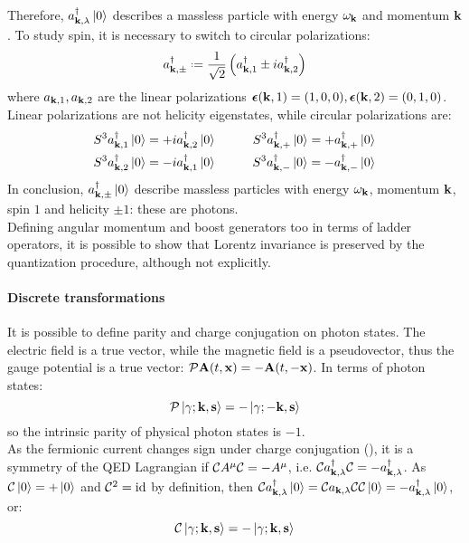 Therefore, $ a_{\mathbf{k},\lambda}^\dagger \ket{0} $ describes a massless particle with energy $ \omega_{\mathbf{k}} $ and momentum $ \mathbf{k} $. To study spin, it is necessary to switch to circular polarizations:
\begin{equation}
  a_{\ve{k},\pm}\dg \defeq \frac{1}{\sqrt{2}} \left( a_{\ve{k},1}\dg \pm i a_{\ve{k},2}\dg \right)
\end{equation}
where $ a_{\mathbf{k},1} , a_{\mathbf{k},2} $ are the linear polarizations $ \boldsymbol{\epsilon}(\mathbf{k},1) = (1,0,0) , \boldsymbol{\epsilon}(\mathbf{k},2) = (0,1,0) $. Linear polarizations are not helicity eigenstates, while circular polarizations are:
\begin{align*}
  S^3 a_{\mathbf{k},1}^\dagger \ket{0} = + i a_{\mathbf{k},2}^\dagger \ket{0} & \qquad & S^3 a_{\mathbf{k},+}^\dagger \ket{0} = + a_{\mathbf{k},+}^\dagger \ket{0} \\
  S^3 a_{\mathbf{k},2}^\dagger \ket{0} = - i a_{\mathbf{k},1}^\dagger \ket{0} & \qquad & S^3 a_{\mathbf{k},-}^\dagger \ket{0} = - a_{\mathbf{k},-}^\dagger \ket{0}
\end{align*}
In conclusion, $ a_{\mathbf{k},\pm}^\dagger \ket{0} $ describe massless particles with energy $ \omega_{\mathbf{k}} $, momentum $ \mathbf{k} $, spin $ 1 $ and helicity $ \pm 1 $: these are photons. \\
Defining angular momentum and boost generators too in terms of ladder operators, it is possible to show that Lorentz invariance is preserved by the quantization procedure, although not explicitly.

\paragraph{Discrete transformations}

It is possible to define parity and charge conjugation on photon states. The electric field is a true vector, while the magnetic field is a pseudovector, thus the gauge potential is a true vector: $ \mathcal{P} \mathbf{A}(t,\mathbf{x}) = - \mathbf{A}(t,-\mathbf{x}) $. In terms of photon states:
\begin{equation}
  \mathcal{P} \ket{\gamma ; \mathbf{k}, \mathbf{s}} = - \ket{\gamma ; -\mathbf{k}, \mathbf{s}}
\end{equation}
so the intrinsic parity of physical photon states is $ -1 $. \\
As the fermionic current changes sign under charge conjugation (), it is a symmetry of the QED Lagrangian if $ \mathcal{C} A^\mu \mathcal{C} = - A^\mu $, i.e. $ \mathcal{C} a_{\mathbf{k},\lambda}^\dagger \mathcal{C} = - a_{\mathbf{k},\lambda}^\dagger $. As $ \mathcal{C} \ket{0} = +\ket{0} $ and $ \mathcal{C}^2 = \operatorname{id} $ by definition, then $ \mathcal{C} a_{\mathbf{k},\lambda}^\dagger \ket{0} = \mathcal{C} a_{\mathbf{k},\lambda} \mathcal{C} \mathcal{C} \ket{0} = - a_{\mathbf{k},\lambda}^\dagger \ket{0} $, or:
\begin{equation}
  \mathcal{C} \ket{\gamma ; \mathbf{k} , \mathbf{s}} = - \ket{\gamma ; \mathbf{k} , \mathbf{s}}
\end{equation}

